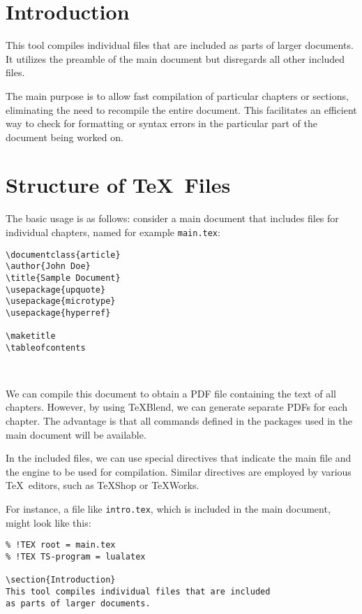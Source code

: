 
\section{Introduction}
This tool compiles individual files that are included as parts of larger documents. 
It utilizes the preamble of the main document but disregards all other included files.

The main purpose is to allow fast compilation of particular chapters or sections, 
eliminating the need to recompile the entire document.
This facilitates an efficient way to check for formatting or syntax errors in
the particular part of the document being worked on.

\section{Structure of \TeX\ Files}

The basic usage is as follows: consider a main document that includes files for
individual chapters, named for example \texttt{main.tex}:


\begin{verbatim}
\documentclass{article}
\author{John Doe}
\title{Sample Document}
\usepackage{upquote}
\usepackage{microtype}
\usepackage{hyperref}

\maketitle
\tableofcontents



\end{verbatim}

We can compile this document to obtain a PDF file containing the text of all
chapters. However, by using \TeX Blend, we can generate separate PDFs for each
chapter. The advantage is that all commands defined in the packages used in the
main document will be available.

In the included files, we can use special directives that indicate the main
file and the engine to be used for compilation. Similar directives are employed
by various \TeX\ editors, such as \TeX Shop or \TeX Works.

For instance, a file like \texttt{intro.tex}, which is included in the main document,
might look like this:

\begin{verbatim}
% !TEX root = main.tex
% !TEX TS-program = lualatex

\section{Introduction}
This tool compiles individual files that are included 
as parts of larger documents. 
\end{verbatim}

